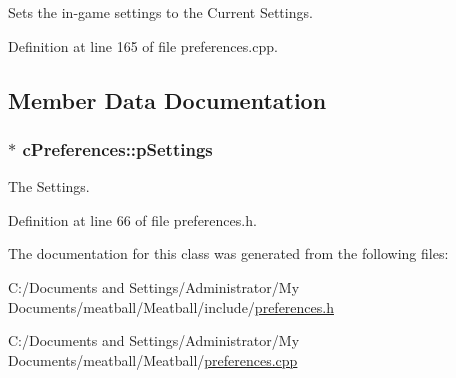 Sets the in-\/game settings to the Current Settings. 



Definition at line 165 of file preferences.\-cpp.



\subsection{Member Data Documentation}
\hypertarget{classc_preferences_a75e0bc75d9ed4414ccae7b8933686af4}{
\subsubsection[{p\-Settings}]{$\ast$ c\-Preferences\-::p\-Settings}}\label{classc_preferences_a75e0bc75d9ed4414ccae7b8933686af4}


The Settings. 



Definition at line 66 of file preferences.\-h.



The documentation for this class was generated from the following files\-:\begin{DoxyCompactItemize}
\item 
C\-:/\-Documents and Settings/\-Administrator/\-My Documents/meatball/\-Meatball/include/\hyperlink{preferences_8h}{preferences.\-h}\item 
C\-:/\-Documents and Settings/\-Administrator/\-My Documents/meatball/\-Meatball/\hyperlink{preferences_8cpp}{preferences.\-cpp}\end{DoxyCompactItemize}
